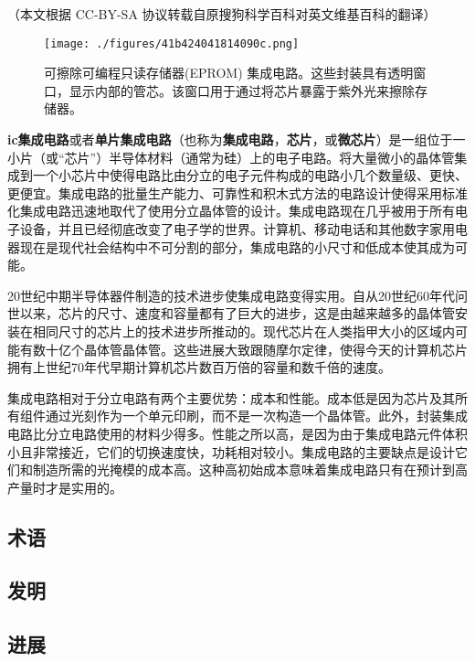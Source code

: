 
（本文根据 CC-BY-SA 协议转载自原搜狗科学百科对英文维基百科的翻译）

\begin{figure}[ht]
\centering
\texttt{[image: ./figures/41b424041814090c.png]}
\caption{可擦除可编程只读存储器(EPROM) 集成电路。这些封装具有透明窗口，显示内部的管芯。该窗口用于通过将芯片暴露于紫外光来擦除存储器。} \label{fig_icJCDL_1}
\end{figure}

\textbf{ic集成电路}或者\textbf{单片集成电路}（也称为\textbf{集成电路}，\textbf{芯片}，或\textbf{微芯片}）是一组位于一小片（或“芯片”）半导体材料（通常为硅）上的电子电路。将大量微小的晶体管集成到一个小芯片中使得电路比由分立的电子元件构成的电路小几个数量级、更快、更便宜。集成电路的批量生产能力、可靠性和积木式方法的电路设计使得采用标准化集成电路迅速地取代了使用分立晶体管的设计。集成电路现在几乎被用于所有电子设备，并且已经彻底改变了电子学的世界。计算机、移动电话和其他数字家用电器现在是现代社会结构中不可分割的部分，集成电路的小尺寸和低成本使其成为可能。

20世纪中期半导体器件制造的技术进步使集成电路变得实用。自从20世纪60年代问世以来，芯片的尺寸、速度和容量都有了巨大的进步，这是由越来越多的晶体管安装在相同尺寸的芯片上的技术进步所推动的。现代芯片在人类指甲大小的区域内可能有数十亿个晶体管晶体管。这些进展大致跟随摩尔定律，使得今天的计算机芯片拥有上世纪70年代早期计算机芯片数百万倍的容量和数千倍的速度。

集成电路相对于分立电路有两个主要优势：成本和性能。成本低是因为芯片及其所有组件通过光刻作为一个单元印刷，而不是一次构造一个晶体管。此外，封装集成电路比分立电路使用的材料少得多。性能之所以高，是因为由于集成电路元件体积小且非常接近，它们的切换速度快，功耗相对较小。集成电路的主要缺点是设计它们和制造所需的光掩模的成本高。这种高初始成本意味着集成电路只有在预计到高产量时才是实用的。

\subsection{术语}



\subsection{发明}



\subsection{进展}



